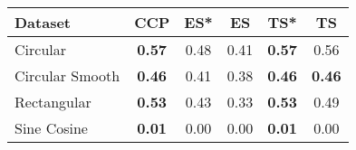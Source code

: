 \begin{tabular}{lccccc}
\toprule
Dataset & CCP & ES* & ES & TS* & TS \\
\midrule
Circular & \textbf{0.57} & 0.48 & 0.41 & \textbf{0.57} & 0.56 \\
Circular Smooth & \textbf{0.46} & 0.41 & 0.38 & \textbf{0.46} & \textbf{0.46} \\
Rectangular & \textbf{0.53} & 0.43 & 0.33 & \textbf{0.53} & 0.49 \\
Sine Cosine & \textbf{0.01} & 0.00 & 0.00 & \textbf{0.01} & 0.00 \\
\bottomrule
\end{tabular}